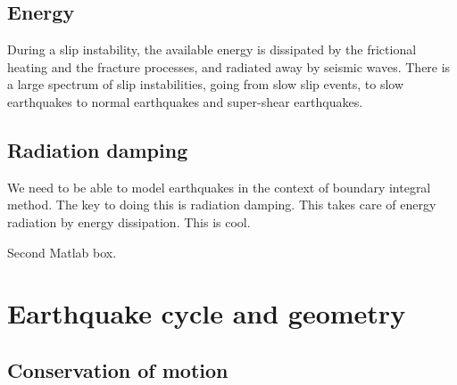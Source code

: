 \documentclass[letterpaper,12pt,]{memoir}
\begin{document}
\section{Energy}

During a slip instability, the available energy is dissipated by the frictional heating and the fracture processes, and radiated away by seismic waves. There is a large spectrum of slip instabilities, going from slow slip events, to slow earthquakes to normal earthquakes and super-shear earthquakes.

\section{Radiation damping}

We need to be able to model earthquakes in the context of boundary integral method. The key to doing this is radiation damping. This takes care of energy radiation by energy dissipation. This is cool. 

Second Matlab box.

\clearpage






\chapter{Earthquake cycle and geometry}

\clearpage

\section{Conservation of motion}
\end{document}
